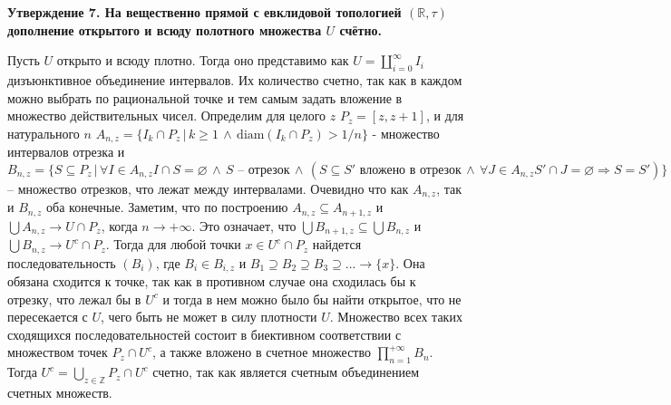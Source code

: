 \documentclass{article}
\begin{document}
\begin{enumerate}
        \textbf{Утверждение 7. На вещественно прямой с евклидовой топологией $(
        \mathbb{R},\tau)$ дополнение открытого и всюду полотного множества $U$
        счётно.}

        Пусть $U$ открыто и всюду плотно. Тогда оно представимо как $U=\coprod_
        {i=0}^{\infty}I_i$ дизъюнктивное объединение интервалов. Их количество
        счетно, так как в каждом можно выбрать по рациональной точке и тем
        самым задать вложение в множество действительных чисел. Определим для
        целого $z$ $P_z=[z,z+1]$, и для натурального $n$ $A_{n,z}=\{I_k\cap P_z
        \,|\,k\geqslant 1\,\wedge\,\text{diam}(I_k\cap P_z)>1/n\}$ - множество
        интервалов отрезка и $B_{n,z}=\{S\subseteq P_z\,|\,\forall I\in A_{n,z}
        I\cap S=\varnothing\,\wedge\,S\text{ – отрезок}\,\wedge\,(S\subseteq S'
        \text{ вложено в отрезок}\,\wedge\,\forall J\in A_{n,z}S'\cap J=
        \varnothing\Rightarrow S=S')\}$ – множество отрезков, что лежат между
        интервалами. Очевидно что как $A_{n,z}$, так и $B_{n,z}$ оба конечные.
        Заметим, что по построению $A_{n,z}\subseteq A_{n+1,z}$ и $\bigcup
        A_{n,z}\rightarrow U\cap P_z$, когда $n\rightarrow +\infty$. Это
        означает, что $\bigcup B_{n+1,z}\subseteq \bigcup B_{n,z}$ и $\bigcup
        B_{n,z}\rightarrow U^c\cap P_z$. Тогда для любой точки $x\in U^c\cap P_z$
        найдется последовательность $(B_i)$, где $B_i\in B_{i,z}$ и $B_1
        \supseteq B_2\supseteq B_3\supseteq ... \rightarrow \{x\}$. Она обязана
        сходится к точке, так как в противном случае она сходилась бы к отрезку,
        что лежал бы в $U^c$ и тогда в нем можно было бы найти открытое, что не
        пересекается с $U$, чего быть не может в силу плотности $U$. Множество
        всех таких сходящихся последовательностей состоит в биективном
        соответствии с множеством точек $P_z\cap U^c$, а также вложено
        в счетное множество $\prod_{n=1}^{+\infty}B_n$. Тогда $U^c=\bigcup_{z\in
        \mathbb{Z}}P_z\cap U^c$ счетно, так как является счетным объединением
        счетных множеств.


\end{enumerate}
\end{document}
